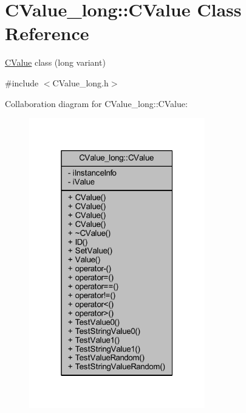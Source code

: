 \hypertarget{class_c_value__long_1_1_c_value}{}\section{C\+Value\+\_\+long\+:\+:C\+Value Class Reference}
\label{class_c_value__long_1_1_c_value}


\hyperlink{class_c_value__long_1_1_c_value}{C\+Value} class ({\ttfamily long} variant)  




{\ttfamily \#include $<$C\+Value\+\_\+long.\+h$>$}



Collaboration diagram for C\+Value\+\_\+long\+:\+:C\+Value\+:
\nopagebreak
\begin{figure}[H]
\begin{center}
\leavevmode
\includegraphics[width=217pt]{class_c_value__long_1_1_c_value__coll__graph}
\end{center}
\end{figure}
